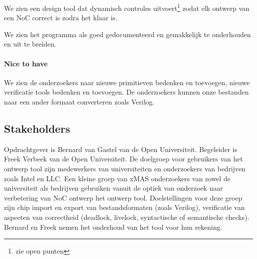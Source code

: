 We zien een design tool dat dynamisch controles uitvoert\footnote{zie open punten} zodat elk ontwerp van een NoC correct is
zodra het klaar is.

We zien het programma als goed gedocumenteerd en gemakkelijk te onderhouden en uit te breiden.

\paragraph{Nice to have} We zien de onderzoekers naar \xmas nieuwe primitieven bedenken en toevoegen, nieuwe verificatie tools
bedenken en toevoegen. De onderzoekers kunnen onze bestanden naar een ander formaat converteren zoals Verilog.

\subsection{Stakeholders}

Opdrachtgever is Bernard van Gastel van de Open Universiteit. Begeleider is Freek Verbeek van de Open Universiteit.
De doelgroep voor gebruikers van het ontwerp tool zijn medewerkers van universiteiten en onderzoekers van bedrijven zoals
Intel en LLC. Een kleine groep van xMAS onderzoekers van zowel de universiteit als bedrijven gebruiken vanuit de optiek
van onderzoek naar verbetering van NoC ontwerp het ontwerp tool. Doelstellingen voor deze groep zijn chip import
en export van bestandsformaten (zoals Verilog), verificatie van aspecten van correctheid (deadlock, livelock,
syntactische of semantische checks). Bernard en Freek nemen het onderhoud van het tool voor hun rekening.


